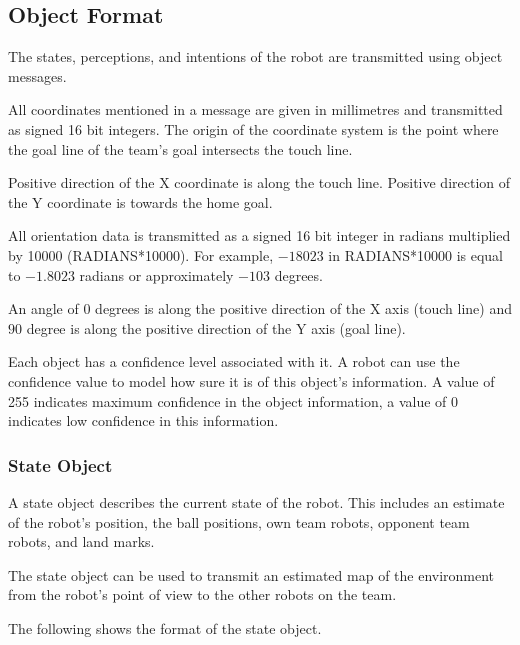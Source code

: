 \documentclass[12pt]{hurocup}
\begin{document}
\subsection*{Object Format}

The states, perceptions, and intentions of the robot are transmitted
using object messages.

All coordinates mentioned in a message are given in millimetres and
transmitted as signed 16 bit integers. The origin of the coordinate
system is the point where the goal line of the team's goal intersects
the touch line.

Positive direction of the X coordinate is along the touch
line. Positive direction of the Y coordinate is towards the home goal.

All orientation data is transmitted as a signed 16 bit integer in
radians multiplied by 10000 (RADIANS*10000). For example, $-18023$ in
RADIANS*10000 is equal to $-1.8023$ radians or approximately $-103$
degrees.

An angle of $0$ degrees is along the positive direction of the X axis
(touch line) and $90$ degree is along the positive direction of the Y
axis (goal line).

Each object has a confidence level associated with it. A robot can use
the confidence value to model how sure it is of this object's
information. A value of 255 indicates maximum confidence in the object
information, a value of 0 indicates low confidence in this
information.

\subsubsection*{State Object}

A state object describes the current state of the robot. This includes
an estimate of the robot's position, the ball positions, own team
robots, opponent team robots, and land marks. 

The state object can be used to transmit an estimated map of the
environment from the robot's point of view to the other robots on the
team.

The following shows the format of the state object.
\end{document}
